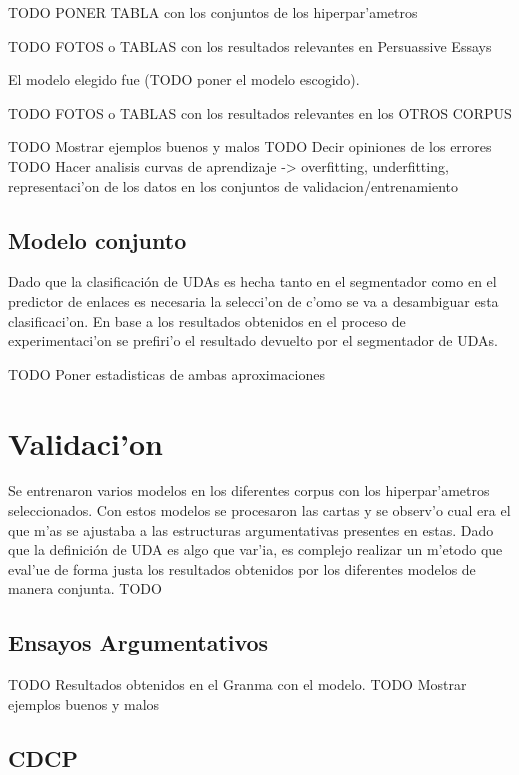 TODO PONER TABLA con los conjuntos de los hiperpar'ametros

TODO FOTOS o TABLAS con los resultados relevantes en Persuassive Essays 

El modelo elegido fue (TODO poner el modelo escogido).

TODO FOTOS o TABLAS con los resultados relevantes en los OTROS CORPUS

TODO Mostrar ejemplos buenos y malos
TODO Decir opiniones de los errores
TODO Hacer analisis curvas de aprendizaje -> overfitting, underfitting, representaci'on de los datos en los conjuntos de validacion/entrenamiento

\subsection{Modelo conjunto}

Dado que la clasificación de UDAs es hecha tanto en el segmentador como en el predictor de enlaces es necesaria 
la selecci'on de c'omo se va a desambiguar esta clasificaci'on. En base a los resultados obtenidos en el proceso
de experimentaci'on se prefiri'o el resultado devuelto por el segmentador de UDAs.

TODO Poner estadisticas de ambas aproximaciones

\section{Validaci'on}

Se entrenaron varios modelos en los diferentes corpus con los hiperpar'ametros seleccionados. Con estos modelos 
se procesaron las cartas y se observ'o cual era el que m'as se ajustaba a las estructuras argumentativas presentes 
en estas. Dado que la definición de UDA es algo que var'ia, es complejo realizar un m'etodo que eval'ue de forma 
justa los resultados obtenidos por los diferentes modelos de manera conjunta. TODO

\subsection{Ensayos Argumentativos}

TODO Resultados obtenidos en el Granma con el modelo.
TODO Mostrar ejemplos buenos y malos

\subsection{CDCP}

